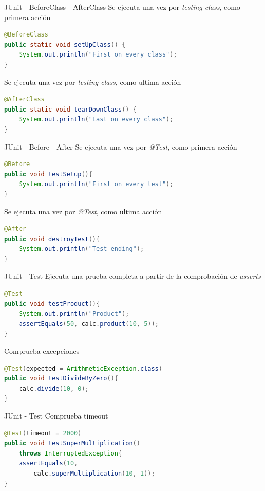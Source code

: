 \documentclass{beamer}
\begin{document}
\begin{frame}[containsverbatim]{JUnit - BeforeClass - AfterClass}
Se ejecuta una vez por \textit{testing class}, como primera acción
\begin{lstlisting}[language=Java]
@BeforeClass
public static void setUpClass() {
	System.out.println("First on every class");
}
\end{lstlisting}

Se ejecuta una vez por \textit{testing class}, como ultima acción
\begin{lstlisting}[language=Java]
@AfterClass
public static void tearDownClass() {
	System.out.println("Last on every class");
}
\end{lstlisting}
\end{frame}

\begin{frame}[containsverbatim]{JUnit - Before - After}
Se ejecuta una vez por \textit{@Test}, como primera acción
\begin{lstlisting}[language=Java]
@Before
public void testSetup(){
	System.out.println("First on every test");
}
\end{lstlisting}

Se ejecuta una vez por \textit{@Test}, como ultima acción
\begin{lstlisting}[language=Java]
@After
public void destroyTest(){
	System.out.println("Test ending");
}
\end{lstlisting}
\end{frame}

\begin{frame}[containsverbatim]{JUnit - Test}
Ejecuta una prueba completa a partir de la comprobación de \textit{asserts}
\begin{lstlisting}[language=Java]
@Test
public void testProduct(){
	System.out.println("Product");
	assertEquals(50, calc.product(10, 5));
}
\end{lstlisting}
Comprueba excepciones
\begin{lstlisting}[language=Java]
@Test(expected = ArithmeticException.class)
public void testDivideByZero(){
	calc.divide(10, 0);
}
\end{lstlisting}
\end{frame}

\begin{frame}[containsverbatim]{JUnit - Test}
Comprueba timeout
\begin{lstlisting}[language=Java]
@Test(timeout = 2000)
public void testSuperMultiplication()
	throws InterruptedException{
	assertEquals(10, 
		calc.superMultiplication(10, 1));
}
\end{lstlisting}
\end{frame}
\end{document}

